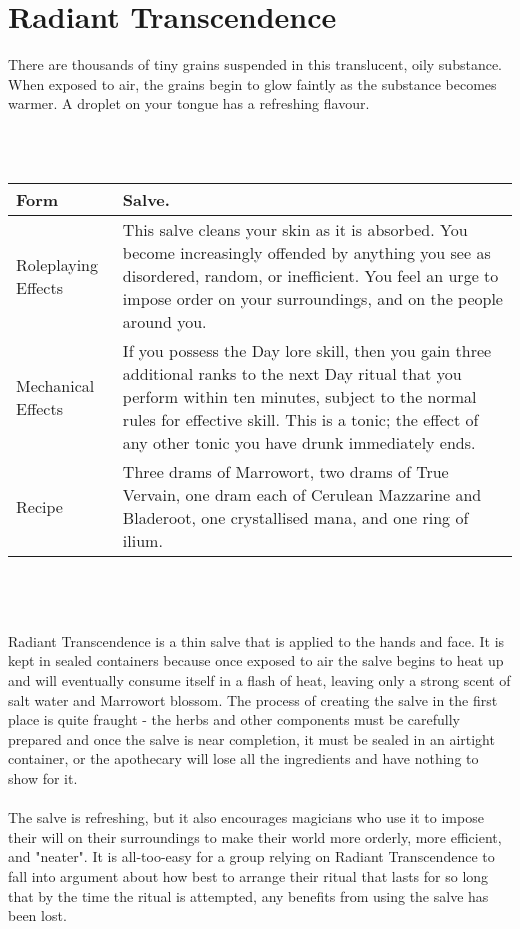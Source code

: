 \documentclass[a5paper,pagesize,10pt,bibtotoc,pointlessnumbers,
normalheadings,DIV=9,twoside=false]{scrbook}
\newcommand\potion[7]{
    \section{#1}
    #2
    \\\\
    \begin{tabular}{| p{.18\linewidth} | p{.74\textwidth} |}
        \hline
        Form & #3 \\
        \hline
        Roleplaying Effects & #4 \\
        \hline
        Mechanical Effects & #5 \\
        \hline
        Recipe & #6 \\
        \hline
    \end{tabular}
    \\\\\\
    #7
    \newpage
}
\begin{document}
\potion{Radiant Transcendence}{
    There are thousands of tiny grains suspended in this translucent, oily substance. When exposed to air, the grains begin to glow faintly as the substance becomes warmer. A droplet on your tongue has a refreshing flavour.
}{Salve.}{
    This salve cleans your skin as it is absorbed. You become increasingly offended by anything you see as disordered, random, or inefficient. You feel an urge to impose order on your surroundings, and on the people around you.
}{
    If you possess the Day lore skill, then you gain three additional ranks to the next Day ritual that you perform within ten minutes, subject to the normal rules for effective skill. This is a tonic; the effect of any other tonic you have drunk immediately ends.
}{
    Three drams of Marrowort, two drams of True Vervain, one dram each of Cerulean Mazzarine and Bladeroot, one crystallised mana, and one ring of ilium.
}{
    Radiant Transcendence is a thin salve that is applied to the hands and face. It is kept in sealed containers because once exposed to air the salve begins to heat up and will eventually consume itself in a flash of heat, leaving only a strong scent of salt water and Marrowort blossom. The process of creating the salve in the first place is quite fraught - the herbs and other components must be carefully prepared and once the salve is near completion, it must be sealed in an airtight container, or the apothecary will lose all the ingredients and have nothing to show for it.\\\\The salve is refreshing, but it also encourages magicians who use it to impose their will on their surroundings to make their world more orderly, more efficient, and "neater". It is all-too-easy for a group relying on Radiant Transcendence to fall into argument about how best to arrange their ritual that lasts for so long that by the time the ritual is attempted, any benefits from using the salve has been lost.
}
\end{document}
